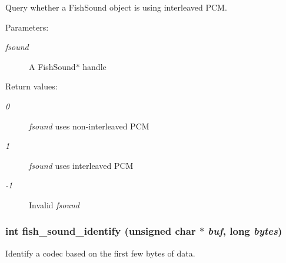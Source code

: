 Query whether a Fish\-Sound object is using interleaved PCM. 

\begin{Desc}
\item[Parameters:]
\begin{description}
\item[{\em fsound}]A Fish\-Sound$\ast$ handle \end{description}
\end{Desc}
\begin{Desc}
\item[Return values:]
\begin{description}
\item[{\em 0}]{\em fsound\/} uses non-interleaved PCM \item[{\em 1}]{\em fsound\/} uses interleaved PCM \item[{\em -1}]Invalid {\em fsound\/} \end{description}
\end{Desc}
\subsubsection{\setlength{\rightskip}{0pt plus 5cm}int fish\_\-sound\_\-identify (unsigned char $\ast$ {\em buf}, long {\em bytes})}\label{fishsound_8h_a3}


Identify a codec based on the first few bytes of data. 

